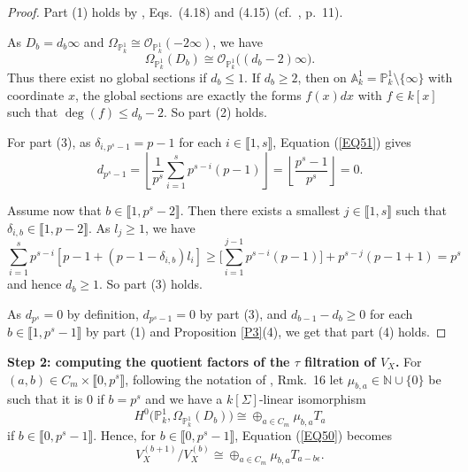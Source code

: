 \documentclass[11pt]{amsart}
\begin{document}
\begin{proof}
Part (1) holds by \cite{BCK}, Eqs.\ (4.18) and (4.15) (cf.\ \cite{KT2}, p.\ 11).

As $D_b=d_b\infty$ and $\Omega_{\mathbb P_k^1}\cong\mathcal O_{\mathbb P_k^1}(-2\infty)$, we have
$$\Omega_{\mathbb P_k^1}(D_b)\cong \mathcal O_{\mathbb P_k^1}\bigl((d_b-2)\infty\bigr).$$
Thus there exist no global sections if $d_b\le 1$. If $d_b\ge 2$, then on $\mathbb A_k^1=\mathbb P_k^1\setminus\{\infty\}$ with coordinate $x$, the global sections are exactly the forms $f(x)dx$ with $f\in k[x]$ such that $\deg(f)\le d_b-2$. So part (2) holds.

For part (3), as $\delta_{i,p^s-1}=p-1$ for
each $i\in\llbracket1,s\rrbracket$, Equation (\ref{EQ51}) gives
\[
d_{p^s-1}=\left\lfloor\frac{1}{p^s}\sum_{i=1}^s p^{s-i}(p-1)\right\rfloor
=\left\lfloor\frac{p^s-1}{p^s}\right\rfloor=0.
\]

Assume now that $b\in\llbracket1,p^s-2\rrbracket$. Then there exists a smallest $j\in\llbracket1,s\rrbracket$ such that $\delta_{i,b}\in\llbracket1,p-2\rrbracket$. As $l_j\ge 1$, we have
$$\sum_{i=1}^s p^{s-i}[p-1+(p-1-\delta_{i,b})l_i]\ge \Big[\sum_{i=1}^{j-1} p^{s-i}(p-1)\Big]+p^{s-j}(p-1+1)=p^s$$
and hence $d_b\ge 1$. So part (3) holds.

As $d_{p^s}=0$ by definition, $d_{p^s-1}=0$ by part (3), and $d_{b-1}-d_b\ge 0$ for each $b\in\llbracket1,p^s-1\rrbracket$ by part (1) and Proposition \ref{P3}(4), we get that part (4) holds.\end{proof}

\smallskip
{\bf Step 2: computing the quotient factors of the $\tau$ filtration of $V_X$.} For $(a,b)\in C_m\times\llbracket0,p^s\rrbracket$, following the notation of \cite{KT2}, Rmk.\ 16 let $\mu_{b,a}\in\mathbb N\cup\{0\}$ be such that it is $0$ if $b=p^s$ and we have a $k[\Sigma]$-linear isomorphism
$$H^0\bigl(\mathbb P_k^1,\Omega_{\mathbb P_k^1}(D_b)\bigr)\cong\oplus_{a\in C_m} \mu_{b,a}T_a$$
if $b\in\llbracket0,p^s-1\rrbracket$. Hence, for $b\in\llbracket0,p^s-1\rrbracket$,  Equation (\ref{EQ50}) becomes
\begin{equation}\label{EQ52}
V_X^{(b+1)}/V_X^{(b)}\cong \oplus_{a\in C_m} \mu_{b,a}T_{a-b\epsilon}.
\end{equation}
\end{document}
